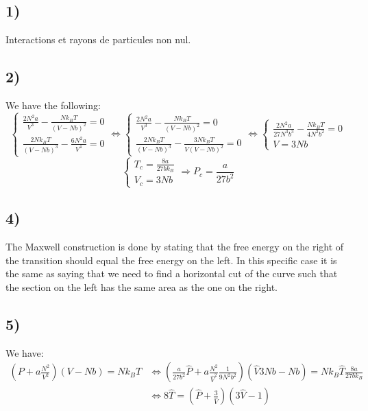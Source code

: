 \documentclass[10pt,a4paper]{book}
\begin{document}
\subsection*{1)}
Interactions et rayons de particules non nul.

\subsection*{2)}
We have the following:
\[
\begin{cases}
\frac{2N^2 a}{V^3} - \frac{N k_B T}{(V - N b)^2} = 0\\
\frac{2 N k_B T}{(V - N b)^3} - \frac{6 N^2 a}{V^4} = 0
\end{cases}
\Leftrightarrow 
\begin{cases}
\frac{2N^2 a}{V^3} - \frac{N k_B T}{(V - N b)^2} = 0\\
\frac{2 N k_B T}{(V - N b)^3} - \frac{3 N k_B T}{V ( V - N b)^2} = 0
\end{cases}
\Leftrightarrow 
\begin{cases}
\frac{2N^2 a}{27 N^3 b^3} - \frac{N k_B T}{4 N^2 b^2} = 0\\
V = 3 N b
\end{cases}
\]
\[
\begin{cases}
T_c = \frac{8 a}{27 b k_B}\\
V_c = 3 N b
\end{cases} \Rightarrow P_c = \frac{a}{27 b^2}
\]

\subsection*{4)} The Maxwell construction is done by stating that the free energy on the right of the transition should equal the free energy on the left. In this specific case it is the same as saying that we need to find a horizontal cut of the curve such that the section on the left has the same area as the one on the right.

\subsection*{5)}
We have:
\begin{align*}
(P + a\frac{N^2}{V^2}) (V - N b) = N k_B T &\Leftrightarrow ( \frac{a}{27 b^2} \hat{P} + a\frac{N^2}{\hat{V}^2}\frac{1}{9 N^2 b^2}) (\hat{V} 3 N b - N b) = N k_B \hat{T} \frac{8 a}{27 b k_B}\\
&\Leftrightarrow 8 \hat{T} = (\hat{P} + \frac{3}{\hat{V}})(3\hat{V} - 1)
\end{align*}
\end{document}
